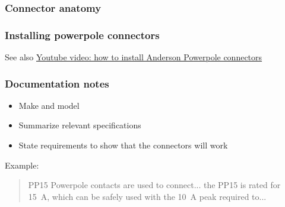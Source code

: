 \documentclass[aspectratio=169]{beamer}
\begin{document}
\begin{frame}
\frametitle{Connector anatomy}
\end{frame}

\begin{frame}
\frametitle{Installing powerpole connectors}
See also \href{https://youtu.be/QzLvdR6X81k}{Youtube video: how to install Anderson Powerpole connectors}
\end{frame}

\begin{frame}
\frametitle{Documentation notes}
\begin{itemize}
\item Make and model
\item Summarize relevant specifications
\item State requirements to show that the connectors will work
\end{itemize}

Example:
\begin{quotation}
PP15 Powerpole contacts are used to connect... the PP15 is rated for \SI{15}{\ampere}, which can be safely used with the \SI{10}{\ampere} peak required to...
\end{quotation}
\end{frame}
\end{document}
